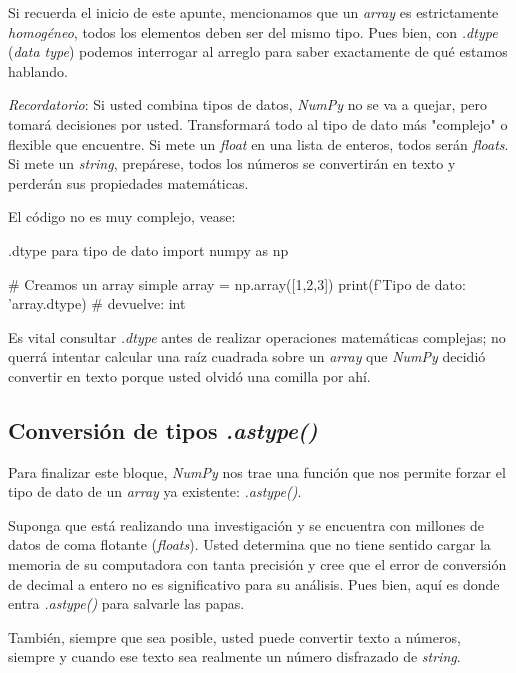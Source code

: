 Si recuerda el inicio de este apunte, mencionamos que un \textit{array} es estrictamente \textit{homogéneo}, todos los elementos deben ser del mismo tipo. Pues bien, con \textit{.dtype} (\textit{data type}) podemos interrogar al arreglo para saber exactamente de qué estamos hablando.

\begin{nota}
    \textit{Recordatorio}: Si usted combina tipos de datos, \textit{NumPy} no se va a quejar, pero tomará decisiones por usted. Transformará todo al tipo de dato más "complejo" o flexible que encuentre. Si mete un \textit{float} en una lista de enteros, todos serán \textit{floats}. Si mete un \textit{string}, prepárese, todos los números se convertirán en texto y perderán sus propiedades matemáticas.
\end{nota}

El código no es muy complejo, vease:
\begin{pycode}{.dtype para tipo de dato}
import numpy as np 

# Creamos un array simple
array = np.array([1,2,3])
print(f'Tipo de dato: 'array.dtype) # devuelve: int
    
\end{pycode}

Es vital consultar \textit{.dtype} antes de realizar operaciones matemáticas complejas; no querrá intentar calcular una raíz cuadrada sobre un \textit{array} que \textit{NumPy} decidió convertir en texto porque usted olvidó una comilla por ahí.



\subsection{Conversión de tipos \textit{.astype()}}

Para finalizar este bloque, \textit{NumPy} nos trae una función que nos permite forzar el tipo de dato de un \textit{array} ya existente: \textit{.astype()}.

Suponga que está realizando una investigación y se encuentra con millones de datos de coma flotante (\textit{floats}). Usted determina que no tiene sentido cargar la memoria de su computadora con tanta precisión y cree que el error de conversión de decimal a entero no es significativo para su análisis. Pues bien, aquí es donde entra \textit{.astype()} para salvarle las papas.

También, siempre que sea posible, usted puede convertir texto a números, siempre y cuando ese texto sea realmente un número disfrazado de \textit{string}.

